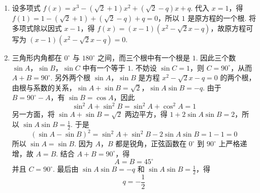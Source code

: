 \documentclass[UTF8,a4paper,oneside,11pt]{ctexbook}
\begin{document}
\begin{solution}
\begin{enumerate}
\item 设多项式 \(f(x)=x^{3}-(\sqrt2+1)x^{2}+(\sqrt2-q)x+q\). 代入 \(x=1\)，得 \(f(1)=1-(\sqrt2+1)+(\sqrt2-q)+q=0\)，所以 \(1\) 是原方程的一个根. 将多项式除以因式 \(x-1\)，得 \(f(x)=(x-1)\left(x^{2}-\sqrt2x-q\right)\)，故原方程可写为 \((x-1)\left(x^{2}-\sqrt2x-q\right)=0\).

\item 三角形内角都在 \(0^{\circ}\) 与 \(180^{\circ}\) 之间，而三个根中有一个根是 \(1\). 因此三个数 \(\sin A\)，\(\sin B\)，\(\sin C\) 中有一个等于 \(1\). 不妨设 \(\sin C=1\)，则 \(C=90^{\circ}\)，从而 \(A+B=90^{\circ}\). 另外两个根 \(\sin A\)，\(\sin B\) 是方程 \(x^{2}-\sqrt2x-q=0\) 的两个根，由根与系数的关系，\(\sin A+\sin B=\sqrt2\)，\(\sin A\sin B=-q\).
由于 \(B=90^{\circ}-A\)，有 \(\sin B=\cos A\)，因此
\[
\sin^{2}A+\sin^{2}B=\sin^{2}A+\cos^{2}A=1
\]
另一方面，将 \(\sin A+\sin B=\sqrt2\) 两边平方，得 \(1+2\sin A\sin B=2\)，所以 \(\sin A\sin B=\frac{1}{2}\).
于是
\[
(\sin A-\sin B)^2=\sin^2A+\sin^2B-2\sin A\sin B=1-1=0
\]
所以 \(\sin A=\sin B\). 因为 \(A\)，\(B\) 都是锐角，正弦函数在 \(0^{\circ}\) 到 \(90^{\circ}\) 上严格递增，故 \(A=B\). 结合 \(A+B=90^{\circ}\)，得
\[
A=B=45^{\circ}
\]
并且 \(C=90^{\circ}\).
最后由 \(\sin A\sin B=-q\) 和 \(\sin A\sin B=\frac12\)，得
\[
q=-\frac12
\]
\end{enumerate}
\end{solution}

\end{document}
